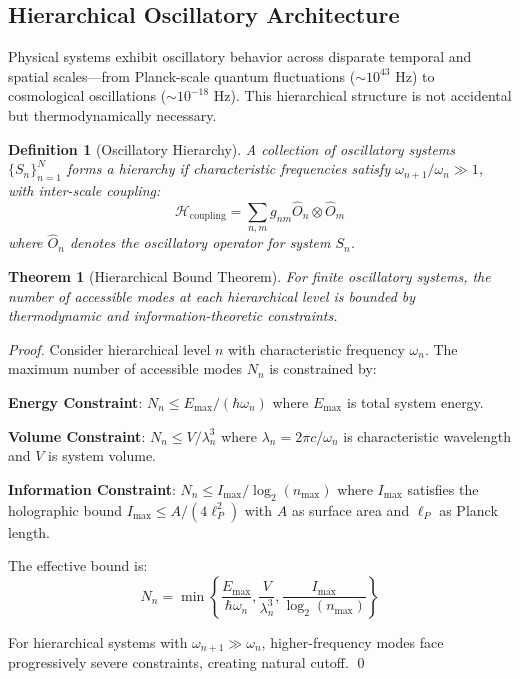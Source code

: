 \documentclass[12pt,a4paper]{article}
\newtheorem{theorem}{Theorem}
\newtheorem{definition}{Definition}
\begin{document}
\subsection{Hierarchical Oscillatory Architecture}

Physical systems exhibit oscillatory behavior across disparate temporal and spatial scales—from Planck-scale quantum fluctuations ($\sim 10^{43}$ Hz) to cosmological oscillations ($\sim 10^{-18}$ Hz). This hierarchical structure is not accidental but thermodynamically necessary.

\begin{definition}[Oscillatory Hierarchy]
A collection of oscillatory systems $\{S_n\}_{n=1}^{N}$ forms a hierarchy if characteristic frequencies satisfy $\omega_{n+1}/\omega_n \gg 1$, with inter-scale coupling:
$$\mathcal{H}_{\text{coupling}} = \sum_{n,m} g_{nm} \hat{O}_n \otimes \hat{O}_m$$
where $\hat{O}_n$ denotes the oscillatory operator for system $S_n$.
\end{definition}

\begin{theorem}[Hierarchical Bound Theorem]
For finite oscillatory systems, the number of accessible modes at each hierarchical level is bounded by thermodynamic and information-theoretic constraints.
\end{theorem}

\begin{proof}
Consider hierarchical level $n$ with characteristic frequency $\omega_n$. The maximum number of accessible modes $N_n$ is constrained by:

\textbf{Energy Constraint}: $N_n \leq E_{\text{max}}/(\hbar\omega_n)$ where $E_{\text{max}}$ is total system energy.

\textbf{Volume Constraint}: $N_n \leq V/\lambda_n^3$ where $\lambda_n = 2\pi c/\omega_n$ is characteristic wavelength and $V$ is system volume.

\textbf{Information Constraint}: $N_n \leq I_{\text{max}}/\log_2(n_{\text{max}})$ where $I_{\text{max}}$ satisfies the holographic bound $I_{\text{max}} \leq A/(4\ell_P^2)$ with $A$ as surface area and $\ell_P$ as Planck length.

The effective bound is:
$$N_n = \min\left\{\frac{E_{\text{max}}}{\hbar\omega_n}, \frac{V}{\lambda_n^3}, \frac{I_{\text{max}}}{\log_2(n_{\text{max}})}\right\}$$

For hierarchical systems with $\omega_{n+1} \gg \omega_n$, higher-frequency modes face progressively severe constraints, creating natural cutoff. \qed
\end{proof}
\end{document}
